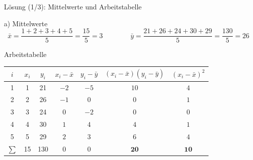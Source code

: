 \documentclass[aspectratio=169,11pt]{beamer}
\begin{document}
\begin{frame}{Lösung (1/3): Mittelwerte und Arbeitstabelle}
  \begin{block}{a) Mittelwerte}
    \[
      \bar{x} = \frac{1+2+3+4+5}{5} = \frac{15}{5} = 3
      \qquad\qquad
      \bar{y} = \frac{21+26+24+30+29}{5} = \frac{130}{5} = 26
    \]
    \vspace{-10pt}
  \end{block}

  \begin{block}{Arbeitstabelle}
    \begin{center}
      \renewcommand{\arraystretch}{1.0}
      \begin{tabular}{c|cc|cc|cc}
        \toprule
        $i$ & $x_i$ & $y_i$ & $x_i-\bar{x}$ & $y_i-\bar{y}$ & $(x_i-\bar{x})(y_i-\bar{y})$ & $(x_i-\bar{x})^{2}$ \\
        \midrule
        1 & 1 & 21 & $-2$ & $-5$ & $10$ & $4$ \\
        2 & 2 & 26 & $-1$ & $0$  & $0$  & $1$ \\
        3 & 3 & 24 & $0$  & $-2$ & $0$  & $0$ \\
        4 & 4 & 30 & $1$  & $4$  & $4$  & $1$ \\
        5 & 5 & 29 & $2$  & $3$  & $6$  & $4$ \\
        \midrule
        $\sum$ & 15 & 130 & $0$ & $0$ & $\mathbf{20}$ & $\mathbf{10}$ \\
        \bottomrule
      \end{tabular}
    \end{center}
  \end{block}
\end{frame}
\end{document}

